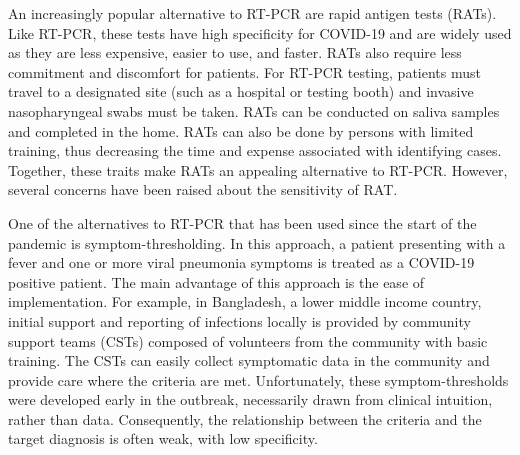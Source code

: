 \documentclass[]{elsarticle} %
\begin{document}
An increasingly popular alternative to RT-PCR are rapid antigen tests
(RATs). Like RT-PCR, these tests have high specificity for COVID-19 and
are widely used as they are less expensive, easier to use, and faster.
RATs also require less commitment and discomfort for patients. For
RT-PCR testing, patients must travel to a designated site (such as a
hospital or testing booth) and invasive nasopharyngeal swabs must be
taken. RATs can be conducted on saliva samples and completed in the
home. RATs can also be done by persons with limited training, thus
decreasing the time and expense associated with identifying cases.
Together, these traits make RATs an appealing alternative to RT-PCR.
However, several concerns have been raised about the sensitivity of RAT.

One of the alternatives to RT-PCR that has been used since the start of
the pandemic is symptom-thresholding. In this approach, a patient
presenting with a fever and one or more viral pneumonia symptoms is
treated as a COVID-19 positive patient. The main advantage of this
approach is the ease of implementation. For example, in Bangladesh, a
lower middle income country, initial support and reporting of infections
locally is provided by community support teams (CSTs) composed of
volunteers from the community with basic training. The CSTs can easily
collect symptomatic data in the community and provide care where the
criteria are met. Unfortunately, these symptom-thresholds were developed
early in the outbreak, necessarily drawn from clinical intuition, rather
than data. Consequently, the relationship between the criteria and the
target diagnosis is often weak, with low specificity.
\end{document}

